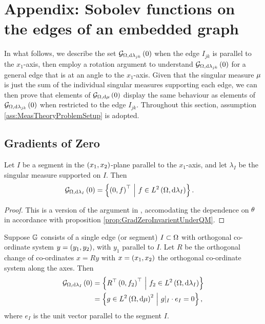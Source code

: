 \section{Appendix: Sobolev functions on the edges of an embedded graph} \label{app:muAnalysis}
In what follows, we describe the set $\mathcal{G}_{ \Omega, \mathrm{d}\lambda_{jk}}\left( 0 \right)$ when the edge $I_{jk}$ is parallel to the $x_1$-axis, then employ a rotation argument to understand $\mathcal{G}_{ \Omega, \mathrm{d}\lambda_{jk}}\left( 0 \right)$ for a general edge that is at an angle to the $x_1$-axis.
Given that the singular measure $\mu$ is just the sum of the individual singular measures supporting each edge, we can then prove that elements of $\mathcal{G}_{ \Omega, \mathrm{d}\mu}\left( 0 \right)$ display the same behaviour as elements of $\mathcal{G}_{ \Omega, \mathrm{d}\lambda_{jk}}\left( 0 \right)$ when restricted to the edge $I_{jk}$.
Throughout this section, assumption \ref{ass:MeasTheoryProblemSetup} is adopted.

\subsection{Gradients of Zero} \label{appS:muGradZero}
\begin{prop} \label{prop:GradZeroParallelZhikov}
	Let $I$ be a segment in the $\left( x_1,x_2 \right)$-plane parallel to the $x_1$-axis, and let $\lambda_I$ be the singular measure supported on $I$.
	Then 
	\begin{align*}
		\mathcal{G}_{ \Omega, \mathrm{d}\lambda_I}\left( 0 \right) &= 
		\left\{  \left( 0,f \right)^\top	\ \middle\vert \  f\in L^{2}\left( \Omega,\mathrm{d}\lambda_I \right)
		 \right\}.
	\end{align*}
\end{prop}
\begin{proof}
	This is a version of the argument in \cite[Section~3.1]{zhikov2000extension}, accomodating the dependence on $\theta$ in accordance with proposition \ref{prop:GradZeroInvarientUnderQM}.
\end{proof}

\begin{prop}\label{prop:RotationOfEdgeGradients}
	Suppose $\mathbb{G}$ consists of a single edge (or segment) $I\subset\Omega$ with orthogonal co-ordinate system $y=\left( y_1,y_2 \right)$, with $y_1$ parallel to $I$.
	Let $R$ be the orthogonal change of co-ordinates $x=Ry$ with $x=\left( x_1,x_2 \right)$ the orthogonal co-ordinate system along the axes.
	Then
	\begin{align*}
		\mathcal{G}_{ \Omega, \mathrm{d}\lambda_I}\left( 0 \right) 
		&= \left\{  R^{\top} \left( 0,f_2 \right)^\top \ \middle\vert \  f_2\in L^{2}\left( \Omega,\mathrm{d}\lambda_I \right)  \right\} \\
		&= \left\{  g\in L^{2}\left( \Omega,\mathrm{d}\mu \right)^2 \ \middle\vert \  g\vert_{I}\cdot e_{I} =0  \right\},
	\end{align*}
where $e_I$ is the unit vector parallel to the segment $I$.
\end{prop}

